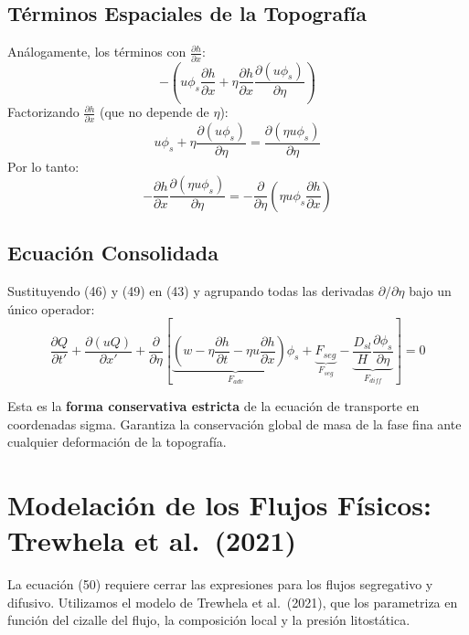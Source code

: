 \documentclass[11pt,a4paper]{article}
\begin{document}
\subsection{Términos Espaciales de la Topografía}
Análogamente, los términos con $\frac{\partial h}{\partial x}$:
\begin{equation}
    -\left(u\phi_s\frac{\partial h}{\partial x} + \eta\frac{\partial h}{\partial x}\frac{\partial(u\phi_s)}{\partial \eta}\right)
\end{equation}
Factorizando $\frac{\partial h}{\partial x}$ (que no depende de $\eta$):
\begin{equation}
    u\phi_s + \eta\frac{\partial(u\phi_s)}{\partial \eta} = \frac{\partial(\eta u \phi_s)}{\partial \eta}
\end{equation}
Por lo tanto:
\begin{equation}
    -\frac{\partial h}{\partial x}\frac{\partial(\eta u \phi_s)}{\partial \eta} = -\frac{\partial}{\partial \eta}\left(\eta u \phi_s \frac{\partial h}{\partial x}\right)
\end{equation}

\subsection{Ecuación Consolidada}
Sustituyendo (46) y (49) en (43) y agrupando todas las derivadas $\partial/\partial\eta$ bajo un único operador:
\begin{equation}
    \frac{\partial Q}{\partial t'} + \frac{\partial(uQ)}{\partial x'} + \frac{\partial}{\partial \eta}\left[\underbrace{\left(w - \eta\frac{\partial h}{\partial t} - \eta u \frac{\partial h}{\partial x}\right)\phi_s}_{F_{adv}} + \underbrace{F_{seg}}_{F_{seg}} - \underbrace{\frac{D_{sl}}{H}\frac{\partial \phi_s}{\partial \eta}}_{F_{diff}}\right] = 0
\end{equation}

Esta es la \textbf{forma conservativa estricta} de la ecuación de transporte en coordenadas sigma. Garantiza la conservación global de masa de la fase fina ante cualquier deformación de la topografía.


\section{Modelación de los Flujos Físicos: Trewhela et al.\ (2021)}
La ecuación (50) requiere cerrar las expresiones para los flujos segregativo y difusivo. Utilizamos el modelo de Trewhela et al.\ (2021), que los parametriza en función del cizalle del flujo, la composición local y la presión litostática.
\end{document}
